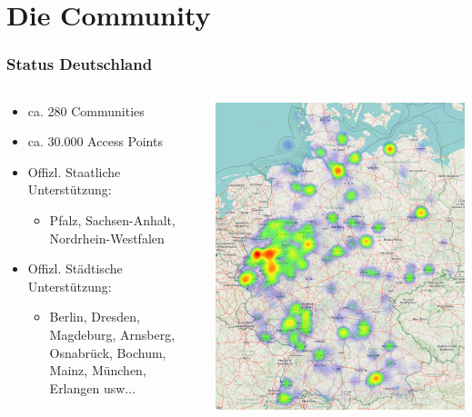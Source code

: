 \section{Die Community}

\begin{frame}
\frametitle{Status Deutschland}
	\begin{columns}[c]   
		\begin{column}[T]{0.6\textwidth}     
			\begin{itemize}
				\item ca. 280 Communities \footnotemark[1]
				\item ca. 30.000 Access Points \footnotemark[1]
				\item Offizl. Staatliche Unterstützung:
				\begin{itemize}
					\item Pfalz, Sachsen-Anhalt, Nordrhein-Westfalen 
				\end{itemize}
				\item Offizl. Städtische Unterstützung:
				\begin{itemize}
					\item Berlin, Dresden, Magdeburg, Arnsberg, Osnabrück, Bochum, Mainz, München, Erlangen usw...
				\end{itemize}
			\end{itemize}
		\end{column}
		\begin{column}[T]{0.4\textwidth}     
			\includegraphics[width=\textwidth]{images/heatmap_germany.png} 
		\end{column}
	\end{columns}		

\end{frame}
